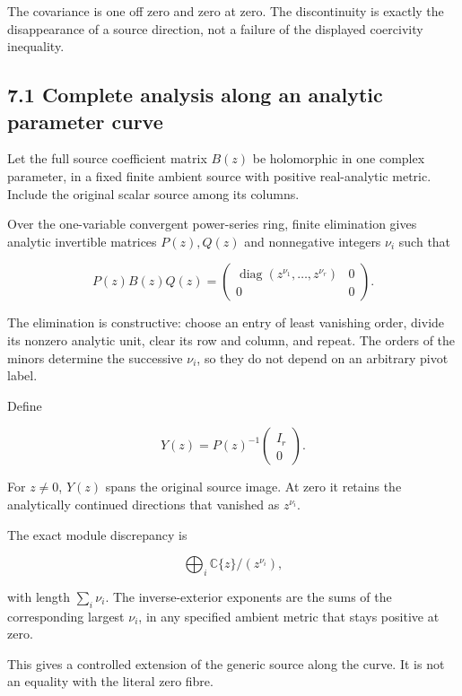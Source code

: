 \documentclass[11pt]{article}
\begin{document}
The covariance is one off zero and zero at zero. The discontinuity is exactly the disappearance of a source direction, not a failure of the displayed coercivity inequality.

\subsection{7.1 Complete analysis along an analytic parameter curve}\label{complete-analysis-along-an-analytic-parameter-curve}

Let the full source coefficient matrix \(B(z)\) be holomorphic in one complex parameter, in a fixed finite ambient source with positive real-analytic metric. Include the original scalar source among its columns.

Over the one-variable convergent power-series ring, finite elimination gives analytic invertible matrices \(P(z),Q(z)\) and nonnegative integers \(\nu_i\) such that

\[
\boxed{
P(z)B(z)Q(z)
=
\begin{pmatrix}
\operatorname{diag}(z^{\nu_1},\ldots,z^{\nu_r})&0\\
0&0
\end{pmatrix}.
}
\tag{44}
\]

The elimination is constructive: choose an entry of least vanishing order, divide its nonzero analytic unit, clear its row and column, and repeat. The orders of the minors determine the successive \(\nu_i\), so they do not depend on an arbitrary pivot label.

Define

\[
Y(z)=P(z)^{-1}
\begin{pmatrix}I_r\\0\end{pmatrix}.
\]

For \(z\ne0\), \(Y(z)\) spans the original source image. At zero it retains the analytically continued directions that vanished as \(z^{\nu_i}\).

The exact module discrepancy is

\[
\boxed{
\bigoplus_i\mathbb C\{z\}/(z^{\nu_i}),
}
\tag{45}
\]

with length \(\sum_i\nu_i\). The inverse-exterior exponents are the sums of the corresponding largest \(\nu_i\), in any specified ambient metric that stays positive at zero.

This gives a controlled extension of the generic source along the curve. It is not an equality with the literal zero fibre.
\end{document}
